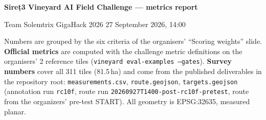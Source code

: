 \documentclass[10pt,a4paper]{article}
\begin{document}
\color{night}

{\LARGE\bfseries Sireț3 Vineyard AI Field Challenge — metrics report}\par
\vspace{2pt}
{\large Team Solemtrix \textperiodcentered{} GigaHack 2026 \textperiodcentered{} 27 September 2026, 14:00}\par
\vspace{4pt}
{\small\color{muted}Numbers are grouped by the six criteria of the organisers' ``Scoring weights'' slide.
\textbf{Official metrics} are computed with the challenge metric definitions on the organisers' 2 reference
tiles (\texttt{vineyard eval-examples --gates}). \textbf{Survey numbers} cover all 311 tiles (81.5\,ha)
and come from the published deliverables in the repository root: \texttt{measurements.csv},
\texttt{route.geojson}, \texttt{targets.geojson} (annotation run \texttt{rc10f}, route run
\texttt{20260927T1400-post-rc10f-pretest}, route from the organizers' pre-test START). All geometry is EPSG:32635, measured planar.}\par

\vspace{6pt}
\end{document}
